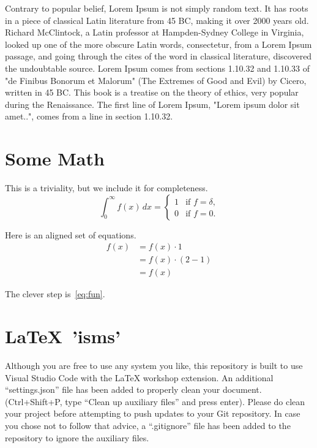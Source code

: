 \documentclass[ms,twoside,print]{nuthesis}
\theoremstyle{definition}
\begin{document}
Contrary to popular belief, Lorem Ipsum is not simply random text. It has roots in a piece of classical Latin literature from 45 BC, making it over 2000 years old. Richard McClintock, a Latin professor at Hampden-Sydney College in Virginia, looked up one of the more obscure Latin words, consectetur, from a Lorem Ipsum passage, and going through the cites of the word in classical literature, discovered the undoubtable source. Lorem Ipsum comes from sections 1.10.32 and 1.10.33 of "de Finibus Bonorum et Malorum" (The Extremes of Good and Evil) by Cicero, written in 45 BC. This book is a treatise on the theory of ethics, very popular during the Renaissance. The first line of Lorem Ipsum, "Lorem ipsum dolor sit amet..", comes from a line in section 1.10.32.~\cite{lorum}


\chapter{Some Math}\label{chap:math}

This is a triviality, but we include it for completeness.
\begin{equation}
\int_0^\infty f(x) \, dx =
\begin{cases} 1 & \mbox{if $f=\delta$,} \\
0 & \mbox{if $f=0$.} \end{cases}
\end{equation}

Here is an aligned set of equations.
\begin{align}
f(x) &= f(x) \cdot 1 \\
     &= f(x) \cdot (2-1)\label{eq:fun}\\
     &= f(x)
\end{align}

The clever step is~\eqref{eq:fun}.

\chapter{\LaTeX~'isms'}

Although you are free to use any system you like, this repository is built to use Visual Studio Code with the LaTeX workshop extension. An additional ``settings.json'' file has been added to properly clean your document. (Ctrl+Shift+P, type ``Clean up auxiliary files'' and press enter). Please do clean your project before attempting to push updates to your Git repository. In case you chose not to follow that advice, a ``.gitignore'' file has been added to the repository to ignore the auxiliary files.
\end{document}
